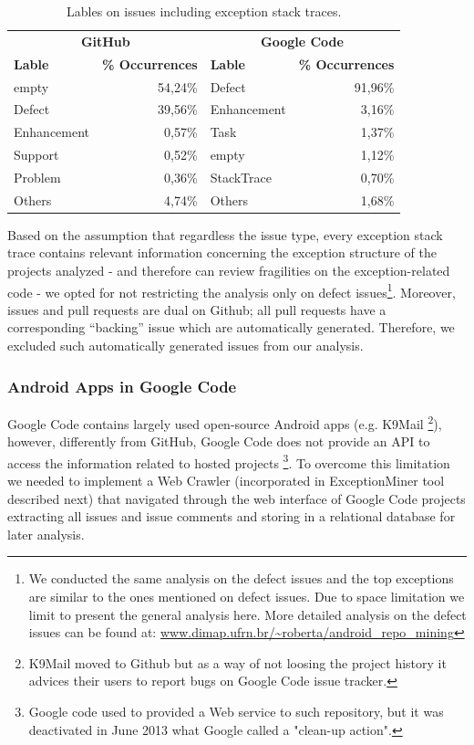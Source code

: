 \documentclass[conference]{IEEEtran}
\begin{document}
\begin{table}
  \centering
  \begin{tabular}{lr|lr}
    \hline
     \multicolumn{2}{c}{\bfseries{GitHub}} &  \multicolumn{2}{c}{\bfseries{Google Code}} \\
      \bfseries{Lable} &  \bfseries{\% Occurrences} &  \bfseries{Lable} &  \bfseries{\% Occurrences} \\
    \hline
empty &	54,24\% & Defect &	91,96\% \\
Defect &	39,56\%  & Enhancement  &	3,16\% \\
Enhancement &	0,57\% & Task	& 1,37\% \\
Support &	0,52\% & empty &	1,12\% \\
Problem &	0,36\% & StackTrace &	0,70\% \\
Others &	4,74\% &  Others &	1,68\% \\   
  \hline
  \end{tabular}
  \caption{Lables on issues including exception stack traces.}
  \label{tab:lables}
\end{table}

Based on the assumption that regardless the issue type, every exception stack
trace contains relevant information concerning the exception structure of the
projects analyzed - and therefore can review fragilities on the exception-related code -  
we opted for not restricting the analysis only on defect
issues\footnote{We conducted the same analysis on the defect issues and the top
exceptions are similar to the ones mentioned on defect issues. Due to space
limitation we limit to present the general analysis here. More detailed analysis
on the defect issues can be found at:
\url{www.dimap.ufrn.br/~roberta/android_repo_mining}}.
 Moreover, issues and pull requests are dual on Github; all pull requests have a corresponding 
``backing'' issue which are automatically generated. Therefore, we excluded such automatically generated
issues from our analysis. 

\subsubsection{Android Apps in Google Code}
Google Code contains largely used open-source Android apps (e.g. K9Mail \footnote{K9Mail moved to Github but as a way of not loosing the project history 
it advices their users to report bugs on Google Code issue tracker.}), however, differently from GitHub, Google Code does not provide an API to access the information related
 to hosted projects \footnote{Google code used to provided a Web service to such repository, but it was deactivated in June 2013 what Google called a "clean-up action".}.
To overcome this limitation we needed to implement a Web Crawler (incorporated in ExceptionMiner tool described next) that navigated 
through the web interface of Google Code projects extracting all issues and issue comments and storing in a relational database for later analysis.
\end{document}
